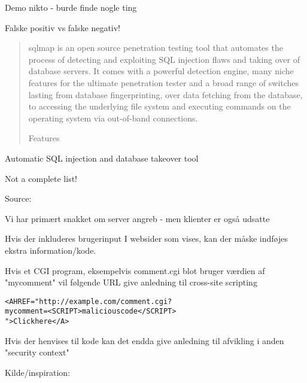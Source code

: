 \documentclass[Screen16to9,17pt]{foils}
\begin{document}
\begin{list1}
\item Demo nikto - burde finde nogle ting
\item Falske positiv vs falske negativ!
\end{list1}



\begin{quote}\small
sqlmap is an open source penetration testing tool that automates the process of detecting and exploiting SQL injection flaws and taking over of database servers. It comes with a powerful detection engine, many niche features for the ultimate penetration tester and a broad range of switches lasting from database fingerprinting, over data fetching from the database, to accessing the underlying file system and executing commands on the operating system via out-of-band connections.

Features
\end{quote}

\begin{list1}
\item Automatic SQL injection and database takeover tool
\end{list1}




Not a complete list!

Source: 


Vi har primært snakket om server angreb - men klienter er også udsatte

\begin{list1}
\item Hvis der inkluderes brugerinput I websider som vises, kan
der måske indføjes ekstra information/kode.
\item Hvis et CGI program, eksempelvis comment.cgi blot bruger værdien af "mycomment" vil
følgende URL give anledning til cross-site scripting
\begin{alltt}
<A HREF="http://example.com/comment.cgi?
mycomment=<SCRIPT>malicious code</SCRIPT>
">Click here</A>
\end{alltt}
\item Hvis der henvises til kode kan det endda give anledning til
afvikling i anden "security context"
\item Kilde/inspiration:
\end{list1}
\end{document}
